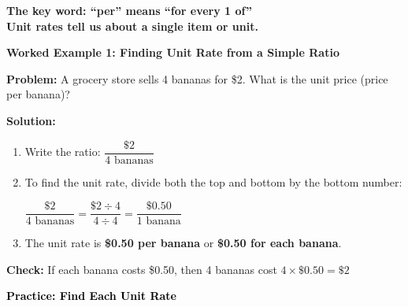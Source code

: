 \documentclass[12pt, letterpaper, fleqn]{article}
\begin{document}
\medskip

\noindent
\textbf{The key word: ``per'' means ``for every 1 of''} \\
\textbf{Unit rates tell us about a single item or unit.}

\vspace{3mm}

\begin{tcolorbox}[colback=white, colframe=black, boxrule=0.6pt, arc=4mm, left=6mm, right=6mm, top=5mm, bottom=5mm]

\textbf{Worked Example 1: Finding Unit Rate from a Simple Ratio}

\medskip

\textbf{Problem:} A grocery store sells 4 bananas for \$2. What is the unit price (price per banana)?

\medskip

\noindent
\textbf{Solution:}

\begin{enumerate}
    \item Write the ratio: $\dfrac{\$2}{4 \text{ bananas}}$
    
    \item To find the unit rate, divide both the top and bottom by the bottom number:
    
    $\dfrac{\$2}{4 \text{ bananas}} = \dfrac{\$2 \div 4}{4 \div 4} = \dfrac{\$0.50}{1 \text{ banana}}$
    
    \item The unit rate is \textbf{\$0.50 per banana} or \textbf{\$0.50 for each banana}.
\end{enumerate}

\medskip

\noindent
\textbf{Check:} If each banana costs \$0.50, then 4 bananas cost $4 \times \$0.50 = \$2$ 

\end{tcolorbox}

\vspace{4mm}

\begin{tcolorbox}[colback=customteal!20]
\large\textcolor{black}{\textbf{Practice: Find Each Unit Rate}}
\end{tcolorbox}
\end{document}
